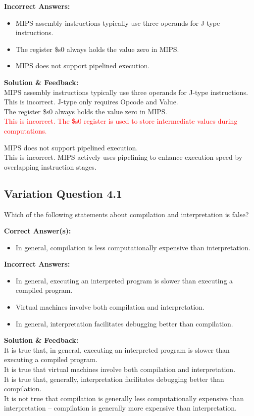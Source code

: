 \textbf{Incorrect Answers:}
\begin{itemize}
    \item MIPS assembly instructions typically use three operands for J-type instructions.
    \item The register \$s0 always holds the value zero in MIPS.
    \item MIPS does not support pipelined execution.
\end{itemize}

\textbf{Solution \& Feedback:}\\
MIPS assembly instructions typically use three operands for J-type instructions.\\
This is incorrect. J-type only requires Opcode and Value.\\

The register \$s0 always holds the value zero in MIPS.\\
\textcolor{red}{
This is incorrect. The \$s0 register is used to store intermediate values during computations.\\
}

MIPS does not support pipelined execution.\\
This is incorrect. MIPS actively uses pipelining to enhance execution speed by overlapping instruction stages.

\subsection{Variation Question 4.1}

Which of the following statements about compilation and interpretation is false?

\textbf{Correct Answer(s):}
\begin{itemize}
    \item In general, compilation is less computationally expensive than interpretation.
\end{itemize}

\textbf{Incorrect Answers:}
\begin{itemize}
    \item In general, executing an interpreted program is slower than executing a compiled program.
    \item Virtual machines involve both compilation and interpretation.
    \item In general, interpretation facilitates debugging better than compilation.
\end{itemize}

\textbf{Solution \& Feedback:}\\
It is true that, in general, executing an interpreted program is slower than executing a compiled program.\\
It is true that virtual machines involve both compilation and interpretation.\\
It is true that, generally, interpretation facilitates debugging better than compilation.\\
It is not true that compilation is generally less computationally expensive than interpretation – compilation is generally more expensive than interpretation.

